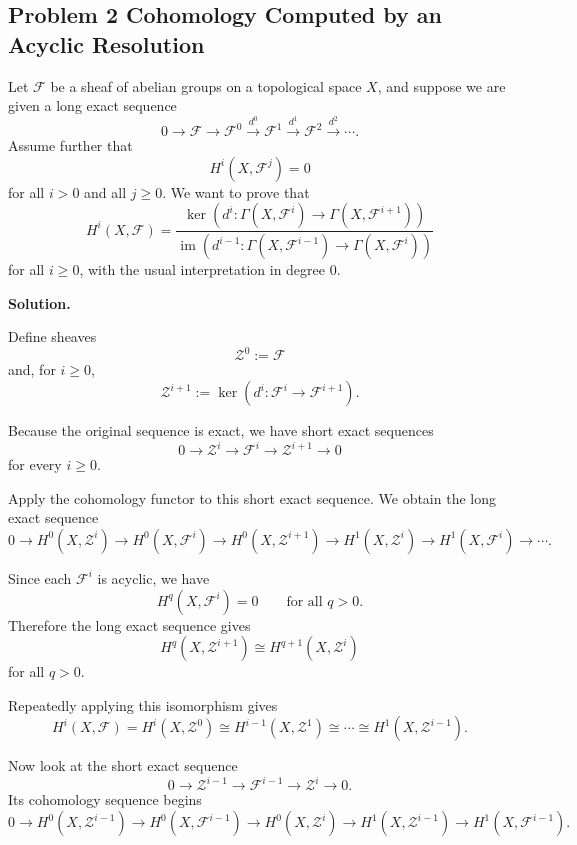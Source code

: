 
\subsection*{Problem 2 Cohomology Computed by an Acyclic Resolution}

Let \(\mathcal F\) be a sheaf of abelian groups on a topological space \(X\), and suppose we are given a long exact sequence
\[
0\longrightarrow \mathcal F
\longrightarrow \mathcal F^0
\xrightarrow{d^0}
\mathcal F^1
\xrightarrow{d^1}
\mathcal F^2
\xrightarrow{d^2}
\cdots .
\]
Assume further that
\[
H^i(X,\mathcal F^j)=0
\]
for all \(i>0\) and all \(j\geq 0\). We want to prove that
\[
H^i(X,\mathcal F)
=
\frac{
	\ker\left(
	d^i:\Gamma(X,\mathcal F^i)\to \Gamma(X,\mathcal F^{i+1})
	\right)
}{
	\operatorname{im}\left(
	d^{i-1}:\Gamma(X,\mathcal F^{i-1})\to \Gamma(X,\mathcal F^i)
	\right)
}
\]
for all \(i\geq 0\), with the usual interpretation in degree \(0\).

\textbf{Solution.}

Define sheaves
\[
\mathcal Z^0:=\mathcal F
\]
and, for \(i\geq 0\),
\[
\mathcal Z^{i+1}:=\ker(d^i:\mathcal F^i\to \mathcal F^{i+1}).
\]

Because the original sequence is exact, we have short exact sequences
\[
0\longrightarrow \mathcal Z^i
\longrightarrow \mathcal F^i
\longrightarrow \mathcal Z^{i+1}
\longrightarrow 0
\]
for every \(i\geq 0\).

Apply the cohomology functor to this short exact sequence. We obtain the long exact sequence
\[
0\to H^0(X,\mathcal Z^i)
\to H^0(X,\mathcal F^i)
\to H^0(X,\mathcal Z^{i+1})
\to H^1(X,\mathcal Z^i)
\to H^1(X,\mathcal F^i)
\to \cdots .
\]

Since each \(\mathcal F^i\) is acyclic, we have
\[
H^q(X,\mathcal F^i)=0
\qquad\text{for all }q>0.
\]
Therefore the long exact sequence gives
\[
H^q(X,\mathcal Z^{i+1})
\cong
H^{q+1}(X,\mathcal Z^i)
\]
for all \(q>0\).

Repeatedly applying this isomorphism gives
\[
H^i(X,\mathcal F)
=
H^i(X,\mathcal Z^0)
\cong
H^{i-1}(X,\mathcal Z^1)
\cong
\cdots
\cong
H^1(X,\mathcal Z^{i-1}).
\]

Now look at the short exact sequence
\[
0\longrightarrow \mathcal Z^{i-1}
\longrightarrow \mathcal F^{i-1}
\longrightarrow \mathcal Z^i
\longrightarrow 0.
\]
Its cohomology sequence begins
\[
0\to H^0(X,\mathcal Z^{i-1})
\to H^0(X,\mathcal F^{i-1})
\to H^0(X,\mathcal Z^i)
\to H^1(X,\mathcal Z^{i-1})
\to H^1(X,\mathcal F^{i-1}).
\]

